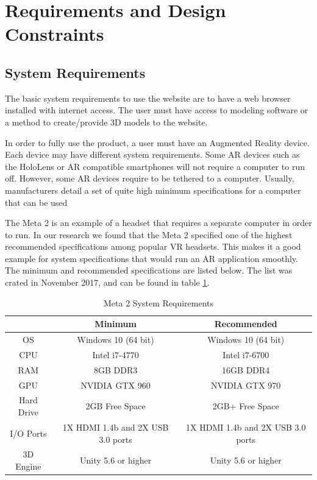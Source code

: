 
\section{Requirements and Design Constraints}


\subsection{System Requirements}

The basic system requirements to use the website are to have a web browser 
installed with internet access.  The user must have access to modeling software 
or a method to create/provide 3D models to the website.

In order to fully use the product, a user must have an Augmented Reality device.
Each device may have different system requirements. Some AR devices such as the 
HoloLens or AR compatible smartphones will not require a computer to run off. 
However, some AR devices require to be tethered to a computer. Usually, 
manufacturers detail a set of quite high minimum specifications for a computer 
that can be used

The Meta 2 is an example of a headset that requires a separate computer in order
to run.  In our research we found that the Meta 2 specified one of the highest 
recommended specifications among popular VR headsets. This makes it a good 
example for system specifications that would run an AR application smoothly. 
The minimum and recommended specifications are listed below. The list was crated
in November 2017, and can be found in table 
\ref{table:metatwosystemrequirements}.

\begin{table}[H]
	\centering
	\begin{tabular}{ | c | c | c | }
		\hline
		& Minimum & Recommended \\ \hline
		OS & Windows 10 (64 bit) & 	Windows 10 (64 bit) \\ \hline
		CPU & Intel i7-4770 & Intel i7-6700 \\ \hline
		RAM & 8GB DDR3 & 16GB DDR4 \\ \hline
		GPU & NVIDIA GTX 960 & NVIDIA GTX 970 \\ \hline
		Hard Drive & 2GB Free Space & 2GB+ Free Space \\ \hline
		I/O Ports & 1X HDMI 1.4b and 2X USB 3.0 ports & 1X HDMI 1.4b and 2X USB 3.0 ports \\ \hline
		3D Engine & Unity 5.6 or higher & Unity 5.6 or higher \\ \hline
	\end{tabular}

	\caption{Meta 2 System Requirements}
	\label{table:metatwosystemrequirements}
\end{table}

